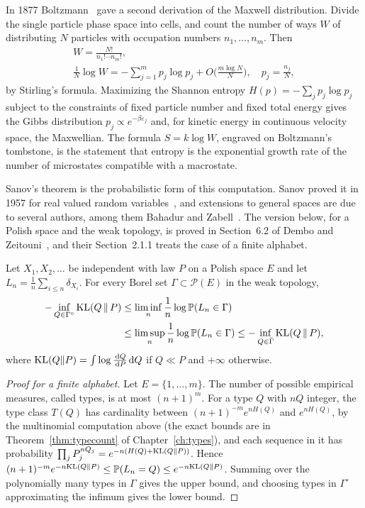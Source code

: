 In 1877 Boltzmann~\cite{boltzmann1877} gave a second derivation of the Maxwell distribution. Divide the single particle phase space into cells, and count the number of ways $W$ of distributing $N$ particles with occupation numbers $n_1,\dots,n_m$. Then
\begin{gather*}
W = \frac{N!}{n_1!\cdots n_m!}, \\
\frac{1}{N}\log W = -\sum_{j=1}^m p_j\log p_j + O\Big(\frac{m\log N}{N}\Big),\quad p_j = \frac{n_j}{N},
\end{gather*}
by Stirling's formula. Maximizing the Shannon entropy $H(p) = -\sum_jp_j\log p_j$ subject to the constraints of fixed particle number and fixed total energy gives the Gibbs distribution $p_j\propto e^{-\beta\varepsilon_j}$ and, for kinetic energy in continuous velocity space, the Maxwellian. The formula $S = k\log W$, engraved on Boltzmann's tombstone, is the statement that entropy is the exponential growth rate of the number of microstates compatible with a macrostate.

Sanov's theorem is the probabilistic form of this computation. Sanov proved it in 1957 for real valued random variables~\cite{sanov1957}, and extensions to general spaces are due to several authors, among them Bahadur and Zabell~\cite{bahadurzabell1979}. The version below, for a Polish space and the weak topology, is proved in Section~6.2 of Dembo and Zeitouni~\cite{dembozeitouni}, and their Section~2.1.1 treats the case of a finite alphabet.

\begin{theorem}[Sanov]
\label{thm:sanov}
Let $X_1,X_2,\dots$ be independent with law $P$ on a Polish space $E$ and let $L_n = \frac1n\sum_{i\leq n}\delta_{X_i}$. For every Borel set $\Gamma\subset\mathcal{P}(E)$ in the weak topology,
\[
\begin{aligned}-\inf_{Q\in\Gamma^\circ}\mathrm{KL}(Q\,\|\,P)&\leq\liminf_n\frac1n\log\mathbb{P}(L_n\in\Gamma)\\ &\leq\limsup_n\frac1n\log\mathbb{P}(L_n\in\Gamma)\leq-\inf_{Q\in\bar\Gamma}\mathrm{KL}(Q\,\|\,P),\end{aligned}
\]
where $\mathrm{KL}(Q\|P) = \int\log\frac{\,\mathrm{d} Q}{\,\mathrm{d} P}\,\mathrm{d} Q$ if $Q\ll P$ and $+\infty$ otherwise.
\end{theorem}

\begin{proof}[Proof for a finite alphabet]
Let $E = \{1,\dots,m\}$. The number of possible empirical measures, called types, is at most $(n+1)^m$. For a type $Q$ with $nQ$ integer, the type class $T(Q)$ has cardinality between $(n+1)^{-m}e^{nH(Q)}$ and $e^{nH(Q)}$, by the multinomial computation above (the exact bounds are in Theorem~\ref{thm:typecount} of Chapter~\ref{ch:types}), and each sequence in it has probability $\prod_j P_j^{nQ_j} = e^{-n(H(Q)+\mathrm{KL}(Q\|P))}$. Hence $(n+1)^{-m}e^{-n\mathrm{KL}(Q\|P)}\leq\mathbb{P}(L_n = Q)\leq e^{-n\mathrm{KL}(Q\|P)}$. Summing over the polynomially many types in $\Gamma$ gives the upper bound, and choosing types in $\Gamma^\circ$ approximating the infimum gives the lower bound.
\end{proof}

